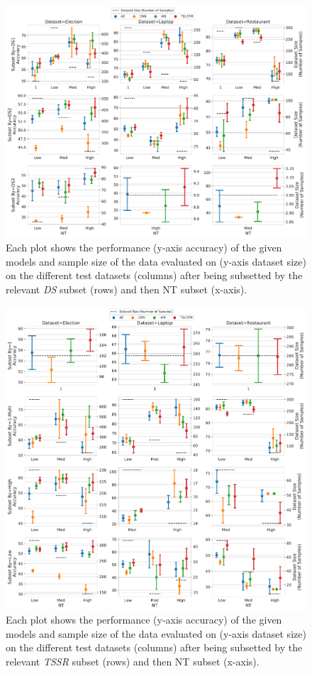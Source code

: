 \begin{figure}[h!]
    \centering
    \includegraphics[scale=0.42]{images/augmentation/methods_performance/baseline/baseline_ds_nt_test_scores.pdf}
    \caption{Each plot shows the performance (y-axis accuracy) of the given models and sample size of the data evaluated on (y-axis dataset size) on the different test datasets (columns) after being subsetted by the relevant \textit{DS} subset (rows) and then NT subset (x-axis).}
    \label{fig:aug_baseline_ds_nt_test_scores}
\end{figure}
\begin{figure}[h!]
    \centering
    \includegraphics[scale=0.42]{images/augmentation/methods_performance/baseline/baseline_tssr_nt_test_scores.pdf}
    \caption{Each plot shows the performance (y-axis accuracy) of the given models and sample size of the data evaluated on (y-axis dataset size) on the different test datasets (columns) after being subsetted by the relevant \textit{TSSR} subset (rows) and then NT subset (x-axis).}
    \label{fig:aug_baseline_tssr_nt_test_scores}
\end{figure}

